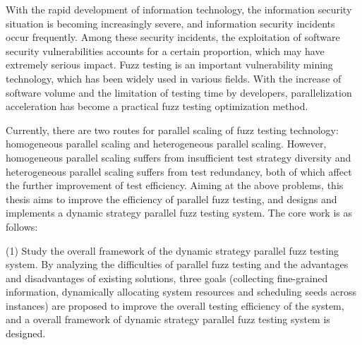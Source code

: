 \documentclass[master]{thesis-uestc}
\begin{document}
\begin{englishabstract}

With the rapid development of information technology, the information security situation is becoming increasingly severe, and information security incidents occur frequently. Among these security incidents, the exploitation of software security vulnerabilities accounts for a certain proportion, which may have extremely serious impact. Fuzz testing is an important vulnerability mining technology, which has been widely used in various fields. With the increase of software volume and the limitation of testing time by developers, parallelization acceleration has become a practical fuzz testing optimization method.

Currently, there are two routes for parallel scaling of fuzz testing technology: homogeneous parallel scaling and heterogeneous parallel scaling. However, homogeneous parallel scaling suffers from insufficient test strategy diversity and heterogeneous parallel scaling suffers from test redundancy, both of which affect the further improvement of test efficiency. Aiming at the above problems, this thesis aims to improve the efficiency of parallel fuzz testing, and designs and implements a dynamic strategy parallel fuzz testing system. The core work is as follows:

(1) Study the overall framework of the dynamic strategy parallel fuzz testing system. By analyzing the difficulties of parallel fuzz testing and the advantages and disadvantages of existing solutions, three goals (collecting fine-grained information, dynamically allocating system resources and scheduling seeds across instances) are proposed to improve the overall testing efficiency of the system, and a overall framework of dynamic strategy parallel fuzz testing system is designed.


\end{englishabstract}
\end{document}
